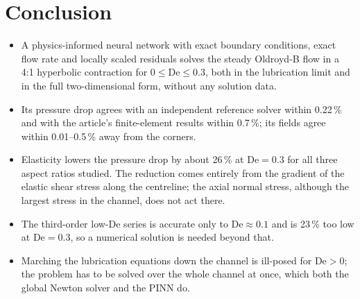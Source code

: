 \documentclass[11pt,a4paper]{article}
\newcommand{\De}{\mathrm{De}}
\begin{document}
\section{Conclusion}
\begin{itemize}
\item A physics-informed neural network with exact boundary conditions, exact flow rate and locally scaled residuals solves the steady Oldroyd-B flow in a 4:1 hyperbolic contraction for $0\le\De\le0.3$, both in the lubrication limit and in the full two-dimensional form, without any solution data.
\item Its pressure drop agrees with an independent reference solver within 0.22\,\% and with the article's finite-element results within 0.7\,\%; its fields agree within 0.01--0.5\,\% away from the corners.
\item Elasticity lowers the pressure drop by about 26\,\% at $\De=0.3$ for all three aspect ratios studied. The reduction comes entirely from the gradient of the elastic shear stress along the centreline; the axial normal stress, although the largest stress in the channel, does not act there.
\item The third-order low-$\De$ series is accurate only to $\De\approx0.1$ and is 23\,\% too low at $\De=0.3$, so a numerical solution is needed beyond that.
\item Marching the lubrication equations down the channel is ill-posed for $\De>0$; the problem has to be solved over the whole channel at once, which both the global Newton solver and the PINN do.
\end{itemize}
\end{document}
